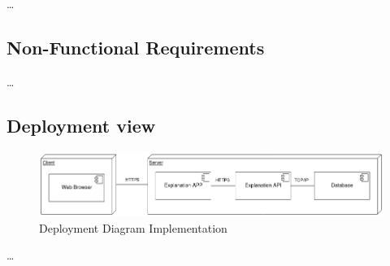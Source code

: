 \dots %

\subsection{Non-Functional Requirements}

\dots %

\subsection{Deployment view}

\begin{figure}[H]
\centering
\includegraphics[width=\textwidth,keepaspectratio]{ch5/assets/deployment_diagram_Implement.png}
\caption[Deployment Diagram Implementation]{Deployment Diagram Implementation}
\label{fig:deployImp}
\end{figure}

\dots %
